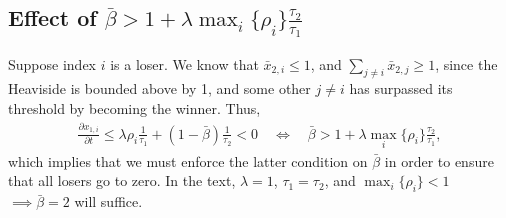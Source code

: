 \documentclass[a4paper]{article}
\begin{document}
\subsection{Effect of $\bar{\beta} > 1 + \lambda \max_i\{\rho_i\} \frac{\tau_2}{\tau_1}$}

Suppose index $i$ is a loser.
We know that $\bar{x}_{2,i} \le 1$, and $\sum_{j \ne i} \bar{x}_{2,j} \ge 1$, since the Heaviside is bounded above by 1, and some other $j \ne i$ has surpassed its threshold by becoming the winner.
Thus,
\begin{align}
 \frac{{\partial x}_{1,i}}{\partial t} \le \lambda \rho_i \frac{1}{\tau_1} + \left( 1 - \bar{\beta} \right) \frac{1}{\tau_2} < 0 \quad \iff \quad \bar{\beta} > 1 + \lambda \max_i\{\rho_i\} \frac{\tau_2}{\tau_1} ,
\end{align}
which implies that we must enforce the latter condition on $\bar{\beta}$ in order to ensure that all losers go to zero. 
In the text, $\lambda = 1$, $\tau_1 = \tau_2$, and $\max_i\{\rho_i\} < 1$ $\implies \bar{\beta} = 2$ will suffice.
\end{document}
